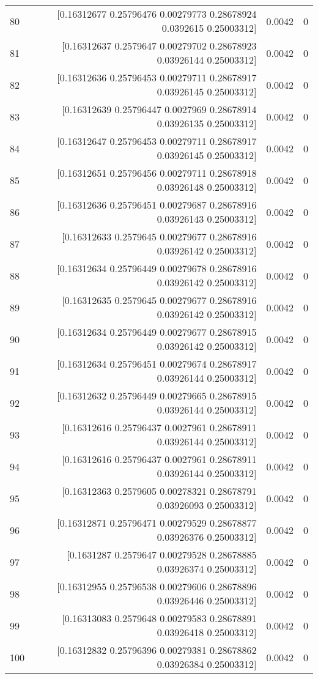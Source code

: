 \begin{longtable}{lrrr}
80 & [0.16312677 0.25796476 0.00279773 0.28678924 0.0392615  0.25003312] & 0.0042 & 0 \\
81 & [0.16312637 0.2579647  0.00279702 0.28678923 0.03926144 0.25003312] & 0.0042 & 0 \\
82 & [0.16312636 0.25796453 0.00279711 0.28678917 0.03926145 0.25003312] & 0.0042 & 0 \\
83 & [0.16312639 0.25796447 0.0027969  0.28678914 0.03926135 0.25003312] & 0.0042 & 0 \\
84 & [0.16312647 0.25796453 0.00279711 0.28678917 0.03926145 0.25003312] & 0.0042 & 0 \\
85 & [0.16312651 0.25796456 0.00279711 0.28678918 0.03926148 0.25003312] & 0.0042 & 0 \\
86 & [0.16312636 0.25796451 0.00279687 0.28678916 0.03926143 0.25003312] & 0.0042 & 0 \\
87 & [0.16312633 0.2579645  0.00279677 0.28678916 0.03926142 0.25003312] & 0.0042 & 0 \\
88 & [0.16312634 0.25796449 0.00279678 0.28678916 0.03926142 0.25003312] & 0.0042 & 0 \\
89 & [0.16312635 0.2579645  0.00279677 0.28678916 0.03926142 0.25003312] & 0.0042 & 0 \\
90 & [0.16312634 0.25796449 0.00279677 0.28678915 0.03926142 0.25003312] & 0.0042 & 0 \\
91 & [0.16312634 0.25796451 0.00279674 0.28678917 0.03926144 0.25003312] & 0.0042 & 0 \\
92 & [0.16312632 0.25796449 0.00279665 0.28678915 0.03926144 0.25003312] & 0.0042 & 0 \\
93 & [0.16312616 0.25796437 0.0027961  0.28678911 0.03926144 0.25003312] & 0.0042 & 0 \\
94 & [0.16312616 0.25796437 0.0027961  0.28678911 0.03926144 0.25003312] & 0.0042 & 0 \\
95 & [0.16312363 0.2579605  0.00278321 0.28678791 0.03926093 0.25003312] & 0.0042 & 0 \\
96 & [0.16312871 0.25796471 0.00279529 0.28678877 0.03926376 0.25003312] & 0.0042 & 0 \\
97 & [0.1631287  0.2579647  0.00279528 0.28678885 0.03926374 0.25003312] & 0.0042 & 0 \\
98 & [0.16312955 0.25796538 0.00279606 0.28678896 0.03926446 0.25003312] & 0.0042 & 0 \\
99 & [0.16313083 0.2579648  0.00279583 0.28678891 0.03926418 0.25003312] & 0.0042 & 0 \\
100 & [0.16312832 0.25796396 0.00279381 0.28678862 0.03926384 0.25003312] & 0.0042 & 0 \\

\end{longtable}
